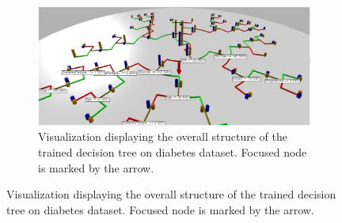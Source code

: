 \begin{figure}
  \centering

  \begin{subfigure}[c]{0.95\textwidth}
    \centering
    \includegraphics[width=\linewidth]{images/3D Decision Tree1.png}
    \caption{Visualization displaying the overall structure of the trained decision tree on diabetes dataset. Focused node is marked by the arrow.}
    \label{fig:top}
  \end{subfigure}

  \vspace{6pt} 


\end{figure}
